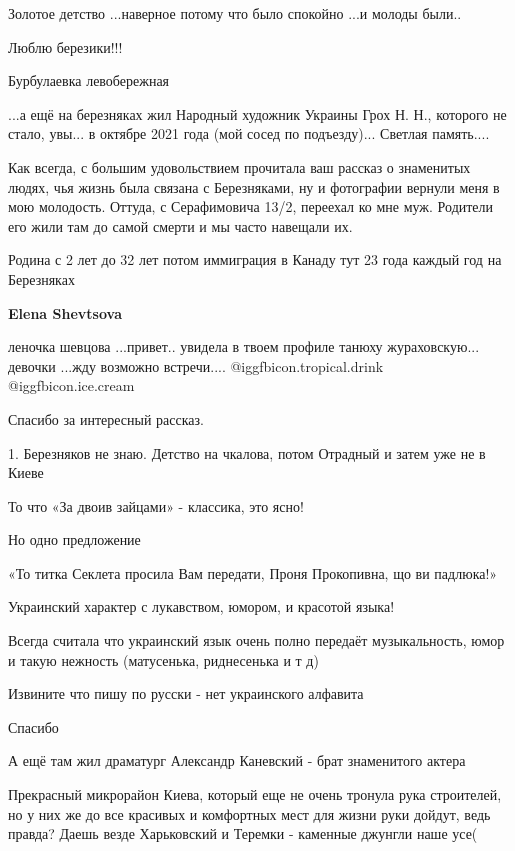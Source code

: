 \begin{itemize}
Золотое детство ...наверное потому что было спокойно ...и молоды были..

Люблю березики!!!

Бурбулаевка левобережная


...а ещё на березняках жил Народный художник Украины Грох Н. Н., которого не
стало, увы... в октябре 2021 года (мой сосед по подъезду)... Светлая память....


Как всегда, с большим удовольствием прочитала ваш рассказ о знаменитых людях,
чья жизнь была связана с Березняками, ну и фотографии вернули меня в мою
молодость. Оттуда, с Серафимовича 13/2, переехал ко мне муж. Родители его жили
там до самой смерти и мы часто навещали их.


Родина с 2 лет до 32 лет потом иммиграция в Канаду тут 23 года каждый год на
Березняках

\textbf{Elena Shevtsova} 

леночка шевцова ...привет.. увидела в твоем профиле танюху жураховскую... девочки
...жду возможно встречи.... @igg{fbicon.tropical.drink}  @igg{fbicon.ice.cream} 

Спасибо за интересный рассказ.


1. Березняков не знаю. Детство на чкалова, потом Отрадный и затем уже не в
Киеве

То что «За двоив зайцами» - классика, это ясно!

Но одно предложение

«То титка Секлета просила Вам передати, Проня Прокопивна, що ви падлюка!»

Украинский характер с лукавством, юмором, и красотой языка!

Всегда считала что украинский язык очень полно передаёт музыкальность, юмор и
такую нежность (матусенька, риднесенька и т д)

Извините что пишу по русски - нет украинского алфавита

Спасибо

А ещё там жил драматург Александр Каневский - брат знаменитого актера


Прекрасный микрорайон Киева, который еще не очень тронула рука строителей, но у
них же до все красивых и комфортных мест для жизни руки дойдут, ведь правда?
Даешь везде Харьковский и Теремки - каменные джунгли наше усе(


\end{itemize}
